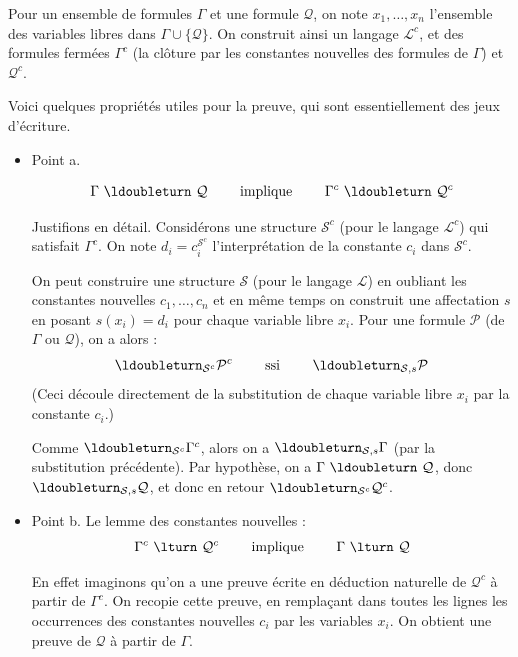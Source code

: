 \documentclass[11pt,class=report,crop=false]{standalone}
\begin{document}
Pour un ensemble de formules $\Gamma$ et une formule $\mathcal{Q}$, on note $x_1, \ldots, x_n$ l'ensemble des variables libres dans $\Gamma \cup \{ \mathcal{Q} \}$.
On construit ainsi un langage $\mathcal{L}^c$, et des formules fermées $\Gamma^c$ (la clôture par les constantes nouvelles des formules de $\Gamma$) et $\mathcal{Q}^c$.

Voici quelques propriétés utiles pour la preuve, qui sont essentiellement des jeux d'écriture.
\begin{itemize}
	\item Point a.
	
	\[
	\Gamma \ \ldoubleturn  \ \mathcal{Q} \qquad \text{ implique } \qquad \Gamma^c \ \ldoubleturn \ \mathcal{Q}^c
	\]


	Justifions en détail. 
	Considérons une structure $\mathcal{S}^c$ (pour le langage $\mathcal{L}^c$) qui satisfait $\Gamma^c$. 
	On note $d_i = c_i^{\mathcal{S}^c}$ l'interprétation de la constante $c_i$ dans $\mathcal{S}^c$.
	
	On peut construire une structure $\mathcal{S}$ (pour le langage $\mathcal{L}$) en oubliant les constantes nouvelles $c_1, \ldots, c_n$ et en même temps on construit une affectation $s$ en posant $s(x_i) = d_i$ pour chaque variable libre $x_i$. Pour une formule $\mathcal{P}$ (de $\Gamma$ ou $\mathcal{Q}$), on a alors :
	\[
	\ldoubleturn_{\mathcal{S}^c} \mathcal{P}^c  \qquad \text{ ssi } \qquad \ldoubleturn_{\mathcal{S}, s} \mathcal{P}
	\]
	(Ceci découle directement de la substitution de chaque variable libre $x_i$ par la constante $c_i$.)
	
	Comme $\ldoubleturn_{\mathcal{S}^c} \Gamma^c$, alors on a $\ldoubleturn_{\mathcal{S}, s} \Gamma$ (par la substitution précédente). 
	Par hypothèse, on a $\Gamma \ \ldoubleturn  \ \mathcal{Q}$, donc
	$\ldoubleturn_{\mathcal{S}, s} \mathcal{Q}$, et donc en retour $\ldoubleturn_{\mathcal{S}^c} \mathcal{Q}^c$.

	\item Point b. Le lemme des constantes nouvelles :
	\[
	\Gamma^c \ \lturn  \ \mathcal{Q}^c \qquad \text{ implique } \qquad \Gamma \ \lturn \ \mathcal{Q}
	\]	
	
	En effet imaginons qu'on a une preuve écrite en déduction naturelle de $\mathcal{Q}^c$ à partir de $\Gamma^c$.
	On recopie cette preuve, en remplaçant dans toutes les lignes les occurrences des constantes nouvelles $c_i$ par les variables $x_i$. On obtient une preuve de $\mathcal{Q}$ à partir de $\Gamma$.


\end{itemize}
\end{document}
